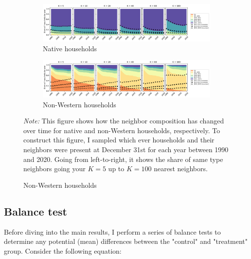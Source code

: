 \documentclass[main.tex]{subfiles}
\begin{document}
\begin{landscape}
\begin{figure}
    \centering
    \caption{Same type neighbor by $K$-proximity}
    \label{fig:temporal_development_knn}
    \begin{subfigure}{1.5\textwidth}
    \includegraphics[width=\linewidth]{figs/temporal_knn_native_1990_2020_w_sim.pdf}
    \caption{Native households}
    \label{fig:temporal_knn_native_1990_2020}
    \end{subfigure}	
    \begin{subfigure}{1.5\textwidth}
    \includegraphics[width=\linewidth]{figs/temporal_knn_non_west_1990_2020_w_sim.pdf}
    \caption{Non-Western households}
    \label{fig:temporal_knn_non_west_1990_2020}
    \end{subfigure}	
\begin{tablenotes}
\item \footnotesize \textit{Note:} This figure shows how the neighbor composition has changed over time for native and non-Western households, respectively. To construct this figure, I sampled which ever households and their neighbors were present at December 31st for each year between 1990 and 2020. Going from left-to-right, it shows the share of same type neighbors going your $K=5$ up to $K=100$ nearest neighbors.
\end{tablenotes}
\end{figure}
\end{landscape}

\subsection{Balance test}

Before diving into the main results, I perform a series of balance tests to determine any potential (mean) differences between the "control" and "treatment" group. Consider the following equation:
\end{document}
